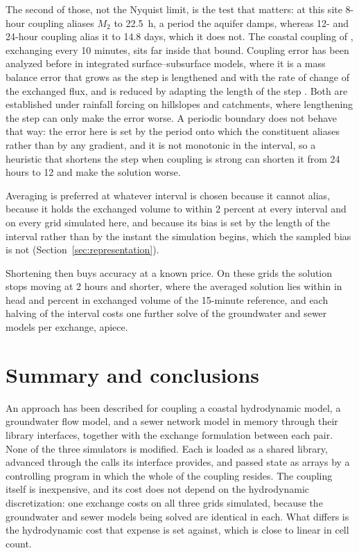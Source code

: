 \documentclass[preprint,authoryear,11pt]{elsarticle}
\begin{document}
The second of those, not the Nyquist limit, is the test that matters: at this site 8-hour coupling aliases $M_2$ to \SI{22.5}{\hour}, a period the aquifer damps, whereas 12- and 24-hour coupling alias it to 14.8 days, which it does not. The coastal coupling of \cite{jin2025gwocean}, exchanging every 10 minutes, sits far inside that bound. Coupling error has been analyzed before in integrated surface--subsurface models, where it is a mass balance error that grows as the step is lengthened \citep{dages2012coupling} and with the rate of change of the exchanged flux, and is reduced by adapting the length of the step \citep{fiorentini2015coupling}. Both are established under rainfall forcing on hillslopes and catchments, where lengthening the step can only make the error worse. A periodic boundary does not behave that way: the error here is set by the period onto which the constituent aliases rather than by any gradient, and it is not monotonic in the interval, so a heuristic that shortens the step when coupling is strong can shorten it from 24 hours to 12 and make the solution worse.

Averaging is preferred at whatever interval is chosen because it cannot alias, because it holds the exchanged volume to within 2 percent at every interval and on every grid simulated here, and because its bias is set by the length of the interval rather than by the instant the simulation begins, which the sampled bias is not (Section~\ref{sec:representation}).

Shortening then buys accuracy at a known price. On these grids the solution stops moving at 2 hours and shorter, where the averaged solution lies within  in head and  percent in exchanged volume of the 15-minute reference, and each halving of the interval costs one further solve of the groundwater and sewer models per exchange,  apiece.

\section{Summary and conclusions}

An approach has been described for coupling a coastal hydrodynamic model, a groundwater flow model, and a sewer network model in memory through their library interfaces, together with the exchange formulation between each pair. None of the three simulators is modified. Each is loaded as a shared library, advanced through the calls its interface provides, and passed state as arrays by a controlling program in which the whole of the coupling resides. The coupling itself is inexpensive, and its cost does not depend on the hydrodynamic discretization: one exchange costs  on all three grids simulated, because the groundwater and sewer models being solved are identical in each. What differs is the hydrodynamic cost that expense is set against, which is close to linear in cell count.
\end{document}
